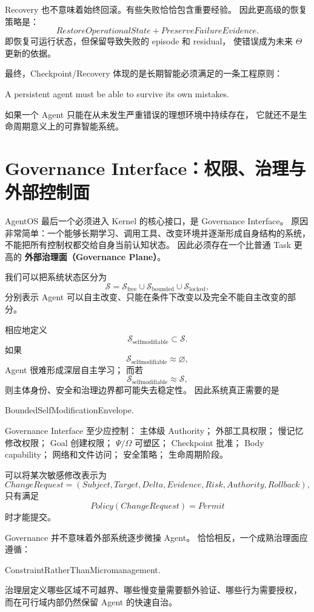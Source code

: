 Recovery 也不意味着始终回滚。有些失败恰恰包含重要经验。
因此更高级的恢复策略是：
\[
\boxed{
RestoreOperationalState
+
PreserveFailureEvidence.
}
\]
即恢复可运行状态，但保留导致失败的 episode 和 residual，
使错误成为未来 $\Theta$ 更新的依据。

最终，Checkpoint/Recovery 体现的是长期智能必须满足的一条工程原则：
\begin{proposition*}
A persistent agent must be able to survive its own mistakes.
\end{proposition*}
如果一个 Agent 只能在从未发生严重错误的理想环境中持续存在，
它就还不是生命周期意义上的可靠智能系统。


\section{Governance Interface：权限、治理与外部控制面}

AgentOS 最后一个必须进入 Kernel 的核心接口，是 Governance Interface。
原因非常简单：一个能够长期学习、调用工具、改变环境并逐渐形成自身结构的系统，
不能把所有控制权都交给自身当前认知状态。
因此必须存在一个比普通 Task 更高的
\textbf{外部治理面（Governance Plane）}。

我们可以把系统状态区分为
\[
\mathcal S
=
\mathcal S_{\mathrm{free}}
\cup
\mathcal S_{\mathrm{bounded}}
\cup
\mathcal S_{\mathrm{locked}},
\]
分别表示 Agent 可以自主改变、只能在条件下改变以及完全不能自主改变的部分。

相应地定义
\[
\mathcal S_{\mathrm{selfmodifiable}}
\subset
\mathcal S.
\]
如果
\[
\mathcal S_{\mathrm{selfmodifiable}}\approx\varnothing,
\]
Agent 很难形成深层自主学习；
而若
\[
\mathcal S_{\mathrm{selfmodifiable}}\approx\mathcal S,
\]
则主体身份、安全和治理边界都可能失去稳定性。
因此系统真正需要的是
\begin{statementbox}
BoundedSelfModificationEnvelope.
\end{statementbox}

Governance Interface 至少应控制：
主体级 Authority；
外部工具权限；
慢记忆修改权限；
Goal 创建权限；
$\Psi/\Omega$ 可塑区；
Checkpoint 批准；
Body capability；
网络和文件访问；
安全策略；
生命周期阶段。

可以将某次敏感修改表示为
\[
ChangeRequest
=
(
Subject,
Target,
Delta,
Evidence,
Risk,
Authority,
Rollback
),
\]
只有满足
\[
Policy(ChangeRequest)=Permit
\]
时才能提交。

Governance 并不意味着外部系统逐步微操 Agent。
恰恰相反，一个成熟治理面应遵循：
\begin{statementbox}
ConstraintRatherThanMicromanagement.
\end{statementbox}
治理层定义哪些区域不可越界、哪些慢变量需要额外验证、哪些行为需要授权，
而在可行域内部仍然保留 Agent 的快速自治。

